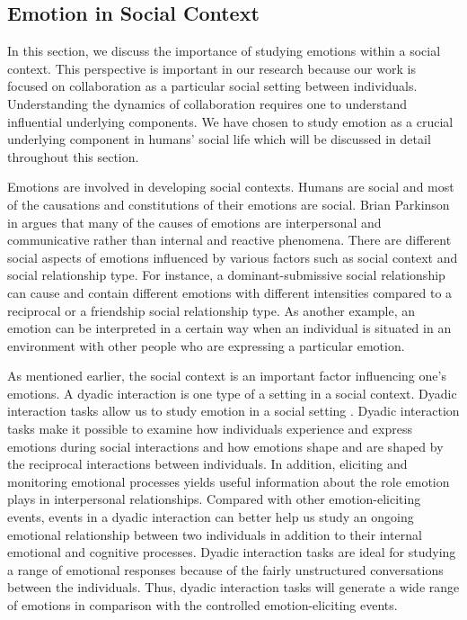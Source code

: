 \documentclass[12pt]{report}
\begin{document}
\subsection{Emotion in Social Context}
\label{section-emotion-social}

In this section, we discuss the importance of studying emotions within a social
context. This perspective is important in our research because our work is
focused on collaboration as a particular social setting between individuals.
Understanding the dynamics of collaboration requires one to understand
influential underlying components. We have chosen to study emotion as a crucial
underlying component in humans' social life which will be discussed in detail
throughout this section.

Emotions are involved in developing social contexts. Humans are social and most
of the causations and constitutions of their emotions are social. Brian
Parkinson in \cite{parkinson:emotions-social} argues that many of the causes of
emotions are interpersonal and communicative rather than internal and reactive
phenomena. There are different social aspects of emotions influenced by various
factors such as social context and social relationship type. For instance, a
dominant-submissive social relationship can cause and contain different emotions
with different intensities compared to a reciprocal or a friendship social
relationship type. As another example, an emotion can be interpreted in a
certain way when an individual is situated in an environment with other people
who are expressing a particular emotion.

As mentioned earlier, the social context is an important factor influencing
one's emotions. A dyadic interaction is one type of a setting in a social
context. Dyadic interaction tasks allow us to study emotion in a social setting
\cite{coan:emotion-dyadic}. Dyadic interaction tasks make it possible to examine
how individuals experience and express emotions during social interactions and
how emotions shape and are shaped by the reciprocal interactions between
individuals. In addition, eliciting and monitoring emotional processes yields
useful information about the role emotion plays in interpersonal relationships.
Compared with other emotion-eliciting events, events in a dyadic interaction can
better help us study an ongoing emotional relationship between two individuals
in addition to their internal emotional and cognitive processes. Dyadic
interaction tasks are ideal for studying a range of emotional responses because
of the fairly unstructured conversations between the individuals. Thus, dyadic
interaction tasks will generate a wide range of emotions in comparison with the
controlled emotion-eliciting events.
\end{document}
